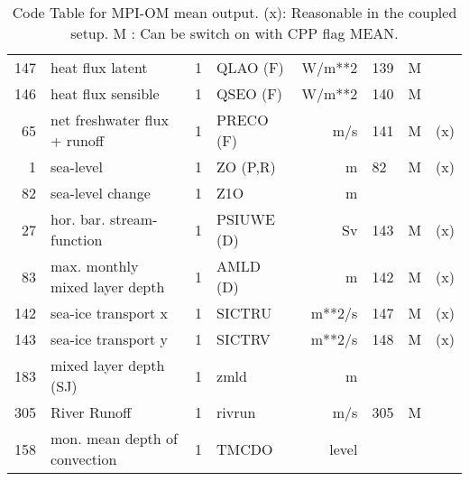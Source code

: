 \begin{table}
\begin{footnotesize}
\begin{tabular}{r|l|l|l|r|l|c|c}
147  & heat flux latent 	       &  1    &  QLAO   (F)	&   W/m**2  &	139	&  M	&	   \\
146  & heat flux sensible	       &  1    &  QSEO   (F)	&   W/m**2  &	140	&  M	&	   \\
 65  & net freshwater flux + runoff    &  1    &  PRECO  (F)	&   m/s     &	141	&  M	&    (x)   \\
  1  & sea-level 		       &  1    &  ZO	 (P,R)  &   m	    &	 82	&  M	&    (x)   \\ 
 82  & sea-level change  	       &  1    &  Z1O		&   m	    &		&	&	   \\
 27  & hor. bar. stream-function        &  1    &  PSIUWE  (D)	&   Sv      &	143	&  M	&    (x)   \\
 83  & max. monthly mixed layer depth  &  1    &  AMLD    (D)	&   m	    &	142	&  M	&    (x)   \\ 
142  & sea-ice transport x	       &  1    &  SICTRU	&   m**2/s  &  147      &  M    &    (x)   \\
143  & sea-ice transport y	       &  1    &  SICTRV	&   m**2/s  &  148      &  M    &    (x)   \\
183  & mixed layer depth (SJ)	       &  1    &  zmld  	&   m	    &	        &       &	   \\ 
305  & River Runoff		       &  1    &  rivrun	&   m/s     &  305      &  M    &	   \\
158  & mon. mean depth of convection   &  1    &  TMCDO 	&   level   &	        &       &	   \\

\end{tabular}
\end{footnotesize}

\caption{Code Table for MPI-OM mean output. \newline
(x): Reasonable in the coupled setup.\newline
 M : Can be switch on with CPP flag MEAN.}
\label{tb:diagnostic:output:mean}
\end{table}

